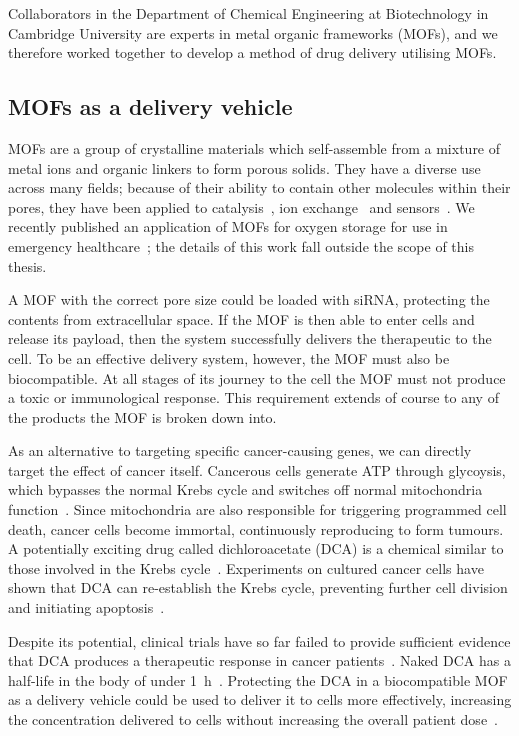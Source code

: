 Collaborators in the Department of Chemical Engineering at Biotechnology in Cambridge University are experts in metal organic frameworks (MOFs), and we therefore worked together to develop a method of drug delivery utilising MOFs.


\subsection{MOFs as a delivery vehicle}
MOFs are a group of crystalline materials which self-assemble from a mixture of metal ions and organic linkers to form porous solids. 
They have a diverse use across many fields; because of their ability to contain other molecules within their pores, they have been applied to catalysis~\cite{ma2009enantioselective, farrusseng2011metal}, ion exchange~\cite{custelcean2007anion, fei2010reversible} and sensors~\cite{kreno2011metal, miller2016metal}. 
We recently published an application of MOFs for oxygen storage for use in emergency healthcare~\cite{moghadam2018computer}; the details of this work fall outside the scope of this thesis. 

A MOF with the correct pore size could be loaded with siRNA, protecting the contents from extracellular space. 
If the MOF is then able to enter cells and release its payload, then the system successfully delivers the therapeutic to the cell. 
To be an effective delivery system, however, the MOF must also be biocompatible.
At all stages of its journey to the cell the MOF must not produce a toxic or immunological response. 
This requirement extends of course to any of the products the MOF is broken down into. 

As an alternative to targeting specific cancer-causing genes, we can directly target the effect of cancer itself. 
Cancerous cells generate ATP through glycoysis, which bypasses the normal Krebs cycle and switches off normal mitochondria function~\cite{warburg1930uber, murray1993cell}. 
Since mitochondria are also responsible for triggering programmed cell death, cancer cells become immortal, continuously reproducing to form tumours. 
A potentially exciting drug called dichloroacetate (DCA) is a chemical similar to those involved in the Krebs cycle~\cite{michelakis2008dichloroacetate, matsuhashi2015activation}. 
Experiments on cultured cancer cells have shown that DCA can re-establish the Krebs cycle, preventing further cell division and initiating apoptosis~\cite{bonnet2007mitochondria}. 

Despite its potential, clinical trials have so far failed to provide sufficient evidence that DCA produces a therapeutic response in cancer patients~\cite{michelakis2010metabolic}. 
Naked DCA has a half-life in the body of under \SI{1}{\hour}~\cite{michelakis2008dichloroacetate}. 
Protecting the DCA in a biocompatible MOF as a delivery vehicle could be used to deliver it to cells more effectively, increasing the concentration delivered to cells without increasing the overall patient dose~\cite{abanades2018mechanistic}. 

